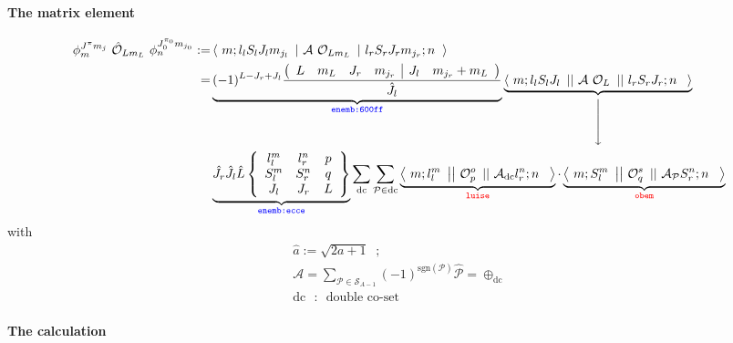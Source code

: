 \documentclass[onecolumn,preprint,superscriptaddress,nofootinbib,notitlepage,10pt,linenumbers]{revtex4-1}
\newcommand{\xdownarrow}[1]{%
  {\left\downarrow\vbox to #1{}\right.\kern-\nulldelimiterspace}
}
\newcommand{\red}[1]{\color{red}{#1}}
\newcommand{\blue}[1]{\color{blue}{#1}}
\newcommand{\la}{\label}
\newcommand{\me}[3] {\left\langle~#1~\left|~#2~\left|~#3~\right.\right.\right\rangle}
\newcommand{\redme}[3] {\left\langle~#1~\left|\left|~#2~\left|\left|~#3~\right.\right.\right.\right.\right\rangle}
\newcommand{\clg}[6]{\ensuremath{\left(\begin{array}{cccc|cc}#1 & #2 & #3 & #4 & #5 & #6 \end{array}\right)}}
\begin{document}
\paragraph{The matrix element}
\begin{align}\la{eq.me}
\phi^{J^\pi m_j}_m~\hat{\mathcal{O}}_{Lm_L}~\phi^{J_0^{\pi_0}m_{j_0}}_n:=&
\me{m;l_lS_lJ_lm_{j_l}}{\mathcal{A}~\mathcal{O}_{Lm_L}}{l_rS_rJ_rm_{j_r};n} \\
=&\underbrace{(-1)^{L-J_r+J_l}\frac{\clg{L}{m_L}{J_r}{m_{j_r}}{J_l}{m_{j_r}+m_L}}{\hat{J_l}}}_
{\blue{\texttt{enemb:600ff}}}
\underbrace{\redme{m;l_lS_lJ_l}{\mathcal{A}~\mathcal{O}_{L}}{l_rS_rJ_r;n}}_{\xdownarrow{.75cm}}\\
&\underbrace{\hat{J_r}\hat{J_l}\hat{L}
\left\lbrace\begin{array}{ccc}l^m_l & l^n_r & p\\ S^m_l & S^n_r & q \\ J_l & J_r & L\end{array}\right\rbrace}_{\blue{\texttt{enemb:ecce}}}
\sum_\text{dc}\sum_{\mathcal{P}\in\text{dc}}
\underbrace{\redme{m;l^m_l}{\mathcal{O}^o_p}{\mathcal{A}_\text{dc}l^n_r;n}}_{\red{\texttt{luise}}}\cdot
\underbrace{\redme{m;S^m_l}{\mathcal{O}^s_q}{\mathcal{A}_\mathcal{P}S^n_r;n}}_{\red{\texttt{obem}}}
\end{align}
with
\begin{align}\la{eq.liteq.mat.descr}
\hat{a}:=\sqrt{2a+1}\;\;;\\
\mathcal{A}=\sum_{\mathcal{P}\in\mathcal{S}_{A-1}}(-1)^{\text{sgn}(\mathcal{P})}\hat{\mathcal{P}}=\oplus_\text{dc}\\
\text{dc ~:~ double co-set}
\end{align}

\paragraph{The calculation}
\end{document}
